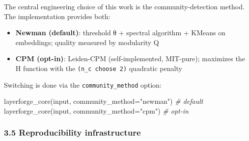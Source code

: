 \documentclass[
]{article}
\newenvironment{Shaded}{}{}
\newcommand{\BuiltInTok}[1]{\textcolor[rgb]{0.00,0.50,0.00}{#1}}
\newcommand{\CommentTok}[1]{\textcolor[rgb]{0.38,0.63,0.69}{\textit{#1}}}
\newcommand{\NormalTok}[1]{#1}
\newcommand{\OperatorTok}[1]{\textcolor[rgb]{0.40,0.40,0.40}{#1}}
\newcommand{\StringTok}[1]{\textcolor[rgb]{0.25,0.44,0.63}{#1}}
\providecommand{\tightlist}{%
  \setlength{\itemsep}{0pt}\setlength{\parskip}{0pt}}
\begin{document}
The central engineering choice of this work is the community-detection
method. The implementation provides both:

\begin{itemize}
\tightlist
\item
  \textbf{Newman (default)}: threshold θ + spectral algorithm + KMeans
  on embeddings; quality measured by modularity Q
\item
  \textbf{CPM (opt-in)}: Leiden-CPM (self-implemented, MIT-pure);
  maximizes the H function with the \texttt{(n\_c\ choose\ 2)} quadratic
  penalty
\end{itemize}

Switching is done via the \texttt{community\_method} option:

\begin{Shaded}
\begin{Highlighting}[]
\NormalTok{layerforge\_core(}\BuiltInTok{input}\NormalTok{, community\_method}\OperatorTok{=}\StringTok{"newman"}\NormalTok{)  }\CommentTok{\# default}
\NormalTok{layerforge\_core(}\BuiltInTok{input}\NormalTok{, community\_method}\OperatorTok{=}\StringTok{"cpm"}\NormalTok{)     }\CommentTok{\# opt{-}in}
\end{Highlighting}
\end{Shaded}

\subsubsection{3.5 Reproducibility
infrastructure}\label{35-reproducibility-infrastructure}
\end{document}
